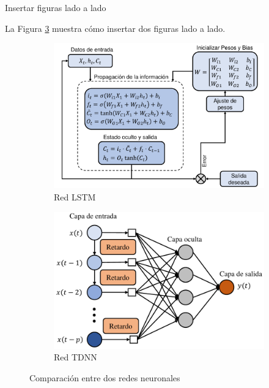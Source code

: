 \documentclass[aspectratio=169]{beamer} %
\begin{document}
\begin{frame}{Insertar figuras lado a lado}

    La Figura \ref{fig:comparacion_redes} muestra cómo insertar dos figuras lado a lado.

    \begin{figure}[htbp]
    \centering
    \begin{subfigure}[b]{0.48\textwidth}
        \centering
        \includegraphics[width=\textwidth]{figuras/LSTM.pdf}
        \caption{Red LSTM}
        \label{fig:figura1a}
    \end{subfigure}
    \hfill
    \begin{subfigure}[b]{0.48\textwidth}
        \centering
        \includegraphics[width=\textwidth]{figuras/TDNN.pdf}
        \caption{Red TDNN}
        \label{fig:figura1b}
    \end{subfigure}
    \caption[Comparación entre dos redes neuronales]{Comparación entre dos redes neuronales}
    \label{fig:comparacion_redes}
\end{figure}
    
\end{frame}
\end{document}
